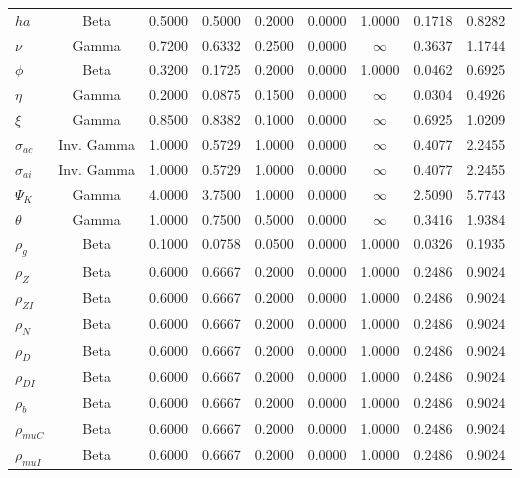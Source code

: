 \begin{center}
\begin{longtable}{lcccccccc}
$ {ha} $ & Beta & 0.5000 & 0.5000 & 0.2000 & 0.0000 & 1.0000 & 0.1718 & 0.8282 \\ 
$ \nu $ & Gamma & 0.7200 & 0.6332 & 0.2500 & 0.0000 & $\infty$ & 0.3637 & 1.1744 \\ 
$ {\phi} $ & Beta & 0.3200 & 0.1725 & 0.2000 & 0.0000 & 1.0000 & 0.0462 & 0.6925 \\ 
$ {\eta} $ & Gamma & 0.2000 & 0.0875 & 0.1500 & 0.0000 & $\infty$ & 0.0304 & 0.4926 \\ 
$ \xi $ & Gamma & 0.8500 & 0.8382 & 0.1000 & 0.0000 & $\infty$ & 0.6925 & 1.0209 \\ 
$ {\sigma_{ac}} $ & Inv. Gamma & 1.0000 & 0.5729 & 1.0000 & 0.0000 & $\infty$ & 0.4077 & 2.2455 \\ 
$ {\sigma_{ai}} $ & Inv. Gamma & 1.0000 & 0.5729 & 1.0000 & 0.0000 & $\infty$ & 0.4077 & 2.2455 \\ 
$ {\Psi_{K}} $ & Gamma & 4.0000 & 3.7500 & 1.0000 & 0.0000 & $\infty$ & 2.5090 & 5.7743 \\ 
$ {\theta} $ & Gamma & 1.0000 & 0.7500 & 0.5000 & 0.0000 & $\infty$ & 0.3416 & 1.9384 \\ 
$ {\rho_g} $ & Beta & 0.1000 & 0.0758 & 0.0500 & 0.0000 & 1.0000 & 0.0326 & 0.1935 \\ 
$ {\rho_Z} $ & Beta & 0.6000 & 0.6667 & 0.2000 & 0.0000 & 1.0000 & 0.2486 & 0.9024 \\ 
$ {\rho_{ZI}} $ & Beta & 0.6000 & 0.6667 & 0.2000 & 0.0000 & 1.0000 & 0.2486 & 0.9024 \\ 
$ {\rho_N} $ & Beta & 0.6000 & 0.6667 & 0.2000 & 0.0000 & 1.0000 & 0.2486 & 0.9024 \\ 
$ {\rho_D} $ & Beta & 0.6000 & 0.6667 & 0.2000 & 0.0000 & 1.0000 & 0.2486 & 0.9024 \\ 
$ {\rho_{DI}} $ & Beta & 0.6000 & 0.6667 & 0.2000 & 0.0000 & 1.0000 & 0.2486 & 0.9024 \\ 
$ {\rho_b} $ & Beta & 0.6000 & 0.6667 & 0.2000 & 0.0000 & 1.0000 & 0.2486 & 0.9024 \\ 
$ {\rho_{muC}} $ & Beta & 0.6000 & 0.6667 & 0.2000 & 0.0000 & 1.0000 & 0.2486 & 0.9024 \\ 
$ {\rho_{muI}} $ & Beta & 0.6000 & 0.6667 & 0.2000 & 0.0000 & 1.0000 & 0.2486 & 0.9024 \\ 
\end{longtable}
 \end{center}
